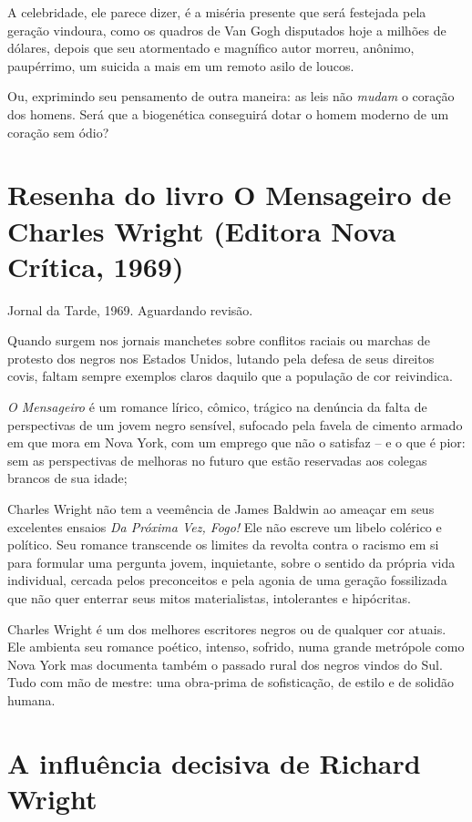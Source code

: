 \documentclass[
  letterpaper,
  DIV=11,
  numbers=noendperiod]{scrreprt}
\begin{document}
A celebridade, ele parece dizer, é a miséria presente que será festejada
pela geração vindoura, como os quadros de Van Gogh disputados hoje a
milhões de dólares, depois que seu atormentado e magnífico autor morreu,
anônimo, paupérrimo, um suicida a mais em um remoto asilo de loucos.

Ou, exprimindo seu pensamento de outra maneira: as leis não \emph{mudam}
o coração dos homens. Será que a biogenética conseguirá dotar o homem
moderno de um coração sem ódio?

\chapter{Resenha do livro O Mensageiro de Charles Wright (Editora Nova
Crítica,
1969)}\label{resenha-do-livro-o-mensageiro-de-charles-wright-editora-nova-cruxedtica-1969}

Jornal da Tarde, 1969. Aguardando revisão.

\hfill\break

Quando surgem nos jornais manchetes sobre conflitos raciais ou marchas
de protesto dos negros nos Estados Unidos, lutando pela defesa de seus
direitos covis, faltam sempre exemplos claros daquilo que a população de
cor reivindica.

\emph{O Mensageiro} é um romance lírico, cômico, trágico na denúncia da
falta de perspectivas de um jovem negro sensível, sufocado pela favela
de cimento armado em que mora em Nova York, com um emprego que não o
satisfaz -- e o que é pior: sem as perspectivas de melhoras no futuro
que estão reservadas aos colegas brancos de sua idade;

Charles Wright não tem a veemência de James Baldwin ao ameaçar em seus
excelentes ensaios \emph{Da Próxima Vez, Fogo!} Ele não escreve um
libelo colérico e político. Seu romance transcende os limites da revolta
contra o racismo em si para formular uma pergunta jovem, inquietante,
sobre o sentido da própria vida individual, cercada pelos preconceitos e
pela agonia de uma geração fossilizada que não quer enterrar seus mitos
materialistas, intolerantes e hipócritas.

Charles Wright é um dos melhores escritores negros ou de qualquer cor
atuais. Ele ambienta seu romance poético, intenso, sofrido, numa grande
metrópole como Nova York mas documenta também o passado rural dos negros
vindos do Sul. Tudo com mão de mestre: uma obra-prima de sofisticação,
de estilo e de solidão humana.

\chapter{A influência decisiva de Richard
Wright}\label{a-influuxeancia-decisiva-de-richard-wright}
\end{document}
